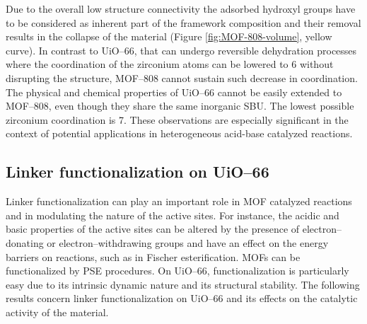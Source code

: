 Due to the overall low structure connectivity the adsorbed hydroxyl groups have to be considered as inherent part of the framework composition and their removal results in the collapse of the material (Figure \ref{fig:MOF-808-volume}, yellow curve). 
\npar
In contrast to UiO--66, that can undergo reversible dehydration processes where the coordination of the zirconium atoms can be lowered to 6 without disrupting the structure, MOF--808 cannot sustain such decrease in coordination. The physical and chemical properties of UiO--66 cannot be easily extended to MOF--808, even though they share the same inorganic SBU. The lowest possible zirconium coordination is 7. These observations are especially significant in the context of potential applications in heterogeneous acid-base catalyzed reactions.

\subsection*{Linker functionalization on UiO--66}
Linker functionalization can play an important role in MOF catalyzed reactions and in modulating the nature of the active sites. For instance, the acidic and basic properties of the active sites can be altered by the presence of electron--donating or electron--withdrawing groups and have an effect on the energy barriers on reactions, such as in Fischer esterification. MOFs can be functionalized by PSE procedures. On UiO--66, functionalization is particularly easy due to its intrinsic dynamic nature and its structural stability. The following results concern linker functionalization on UiO--66 and its effects on the catalytic activity of the material. 

